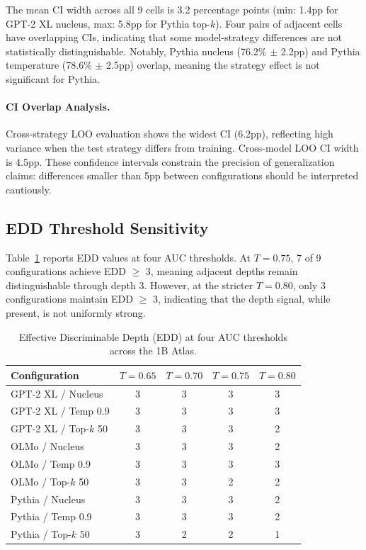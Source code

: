 \documentclass[11pt,a4paper]{article}
\begin{document}
The mean CI width across all 9 cells is 3.2 percentage points (min: 1.4pp for GPT-2 XL nucleus, max: 5.8pp for Pythia top-$k$). Four pairs of adjacent cells have overlapping CIs, indicating that some model-strategy differences are not statistically distinguishable. Notably, Pythia nucleus (76.2\% $\pm$ 2.2pp) and Pythia temperature (78.6\% $\pm$ 2.5pp) overlap, meaning the strategy effect is not significant for Pythia.

\paragraph{CI Overlap Analysis.} Cross-strategy LOO evaluation shows the widest CI (6.2pp), reflecting high variance when the test strategy differs from training. Cross-model LOO CI width is 4.5pp. These confidence intervals constrain the precision of generalization claims: differences smaller than 5pp between configurations should be interpreted cautiously.

\subsection{EDD Threshold Sensitivity}

Table~\ref{tab:edd} reports EDD values at four AUC thresholds. At $T{=}0.75$, 7 of 9 configurations achieve EDD $\geq$ 3, meaning adjacent depths remain distinguishable through depth 3. However, at the stricter $T{=}0.80$, only 3 configurations maintain EDD $\geq$ 3, indicating that the depth signal, while present, is not uniformly strong.

\begin{table}[t]
\centering
\caption{Effective Discriminable Depth (EDD) at four AUC thresholds across the 1B Atlas.}
\label{tab:edd}
\small
\begin{tabular}{lcccc}
\toprule
\textbf{Configuration} & $T{=}0.65$ & $T{=}0.70$ & $T{=}0.75$ & $T{=}0.80$ \\
\midrule
GPT-2 XL / Nucleus & 3 & 3 & 3 & 3 \\
GPT-2 XL / Temp 0.9 & 3 & 3 & 3 & 3 \\
GPT-2 XL / Top-$k$ 50 & 3 & 3 & 3 & 2 \\
OLMo / Nucleus & 3 & 3 & 3 & 2 \\
OLMo / Temp 0.9 & 3 & 3 & 3 & 3 \\
OLMo / Top-$k$ 50 & 3 & 3 & 2 & 2 \\
Pythia / Nucleus & 3 & 3 & 3 & 2 \\
Pythia / Temp 0.9 & 3 & 3 & 3 & 2 \\
Pythia / Top-$k$ 50 & 3 & 2 & 2 & 1 \\
\bottomrule
\end{tabular}
\end{table}
\end{document}
